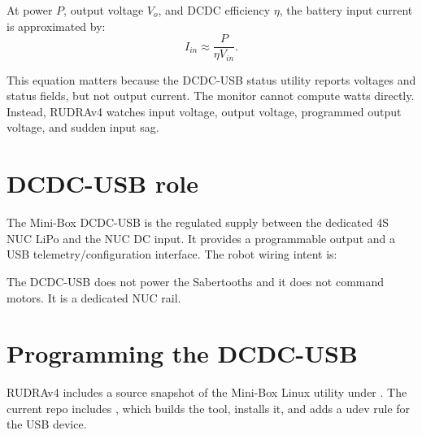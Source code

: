 At power \(P\), output voltage \(V_o\), and DCDC efficiency \(\eta\), the battery input current is approximated by:
\begin{equation}
I_{in} \approx \frac{P}{\eta V_{in}}.
\end{equation}

This equation matters because the DCDC-USB status utility reports voltages and status fields, but not output current.  The monitor cannot compute watts directly.  Instead, RUDRAv4 watches input voltage, output voltage, programmed output voltage, and sudden input sag.

\section{DCDC-USB role}
The Mini-Box DCDC-USB is the regulated supply between the dedicated 4S NUC LiPo and the NUC DC input.  It provides a programmable output and a USB telemetry/configuration interface.  The robot wiring intent is:

\begin{center}
\end{center}

The DCDC-USB does not power the Sabertooths and it does not command motors.  It is a dedicated NUC rail.

\section{Programming the DCDC-USB}
RUDRAv4 includes a source snapshot of the Mini-Box Linux utility under .  The current repo includes , which builds the tool, installs it, and adds a udev rule for the USB device.

